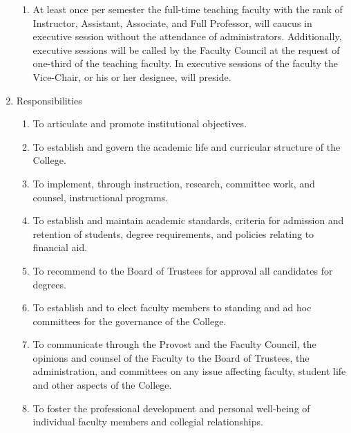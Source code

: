 \documentclass[letterpaper, 11pt]{article}
\begin{document}
\begin{enumerate}[label=\alph*)]
{\begin{enumerate}[label=\arabic*)]
							\item{At least once per semester the full-time teaching faculty with the rank of Instructor, Assistant, Associate, and Full Professor, will caucus in executive session without the attendance of administrators.  Additionally, executive sessions will be called by the Faculty Council at the request of one-third of the teaching faculty.  In executive sessions of the faculty the Vice-Chair, or his or her designee, will preside.}
						\end{enumerate}
					}
					\item{Responsibilities
						\begin{enumerate}[label=\arabic*)]
							\item{To articulate and promote institutional objectives.}
							\item{To establish and govern the academic life and curricular structure of the College.}
							\item{To implement, through instruction, research, committee work, and counsel, instructional programs.}
							\item{To establish and maintain academic standards, criteria for admission and retention of students, degree requirements, and policies relating to financial aid.}
							\item{To recommend to the Board of Trustees for approval all candidates for degrees.}
							\item{To establish and to elect faculty members to standing and ad hoc committees for the governance of the College.}
							\item{To communicate through the Provost and the Faculty Council, the opinions and counsel of the Faculty to the Board of Trustees, the administration, and committees on any issue affecting faculty, student life and other aspects of the College.}
							\item{To foster the professional development and personal well-being of individual faculty members and collegial relationships.}
						\end{enumerate}
					}
				\end{enumerate}
\end{document}
